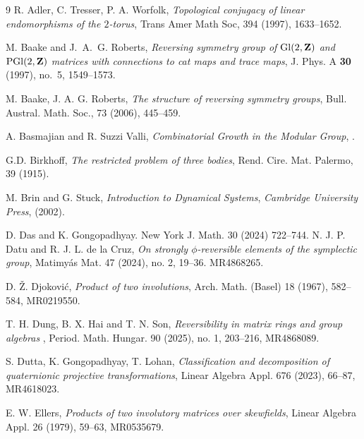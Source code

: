 \documentclass[12pt]{amsart}
\theoremstyle{plain}
\theoremstyle{definition}
\theoremstyle{remark}
\begin{document}


 \begin{thebibliography}{9}
   R. Adler, C. Tresser, P. A. Worfolk, {\em Topological conjugacy of linear endomorphisms of the $2$-torus}, Trans Amer Math Soc, 394 (1997), 1633–1652.


 M. Baake and J.~A.~G. Roberts, {\em Reversing symmetry group of ${\rm Gl}(2,{\bf Z})$ and ${\rm PGl}(2,{\bf Z})$ matrices with connections to cat maps and trace maps}, J. Phys. A {\bf 30} (1997), no.~5, 1549--1573. 
 

 M. Baake, J. A. G. Roberts, {\em The structure of reversing symmetry groups}, Bull. Austral. Math. Soc.,  73 (2006), 445--459. 

	A. Basmajian and R. Suzzi Valli, \emph{Combinatorial Growth in the Modular Group},
			.

             G.D. Birkhoff, {\em The restricted problem of three bodies}, Rend. Cire. Mat. Palermo, 39 (1915).
            
           
 M. Brin and G. Stuck, {\em Introduction to Dynamical Systems}, \emph{Cambridge University Press}, (2002).

             D. Das and  K. Gongopadhyay.
			\newblock     New York J. Math. 30 (2024) 722–744.
 N. J. P. Datu and R. J. L. de la Cruz, {\em On strongly $\phi$-reversible elements of the symplectic group},  Matimyás Mat. 47 (2024), no. 2, 19–36. MR4868265.

 D. Ž. Djoković,  {\em Product of two involutions}, Arch. Math. (Basel) 18 (1967), 582--584, MR0219550.

T. H. Dung, B. X. Hai and T. N. Son, {\em Reversibility in matrix rings and group algebras}
, Period. Math. Hungar. 90 (2025), no. 1, 203–216, MR4868089.

  S. Dutta,  K.  Gongopadhyay,  T.  Lohan,  {\em Classification and decomposition of quaternionic projective transformations}, Linear Algebra Appl. 676 (2023), 66--87, MR4618023.


E. W. Ellers, {\em Products of two involutory matrices over skewfields}, Linear Algebra Appl. 26 (1979), 59--63, MR0535679.



\end{thebibliography}
\end{document}
